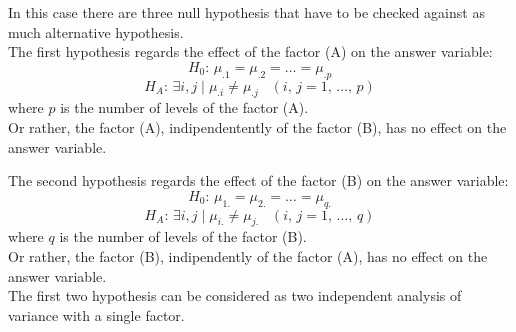 \begin{frame}
  \vspace*{.25cm} 
  In this case there are three null hypothesis that have to be checked against as much alternative hypothesis.\\
  \vspace*{.5cm}
  The first hypothesis regards the effect of the factor (A) on the answer variable:
  $$ H_0: \,\mu_{.1} = \mu_{.2} = \dots = \mu_{.p} $$
  $$ H_A: \, \exists i,j \mid \mu_{.i} \neq \mu_{.j}\;\;\;(i,\,j=1,\,\dots,\,p) $$
  where $ p $ is the number of levels of the factor (A).\\
  \vspace*{.75cm}
  Or rather, the factor (A), indipendentently of the factor (B), has no effect on the answer variable.
\end{frame}

\begin{frame}
  \vspace*{.25cm} 
  The second hypothesis regards the effect of the factor (B) on the answer variable:
  $$ H_0:\,\mu_{1.}=\mu_{2.}=\dots=\mu_{q.} $$
  $$ H_{A}:\,\exists i,j\mid\mu_{i.}\neq\mu_{j.}\;\;\;(i,\,j=1,\,\dots,\,q) $$
  where $ q $ is the number of levels of the factor (B).\\
  \vspace*{.75cm}
  Or rather, the factor (B), indipendently of the factor (A), has no effect on the answer variable.\\
  \vspace*{.5cm}
  The first two hypothesis can be considered as two independent analysis of variance with a single factor.
\end{frame}

